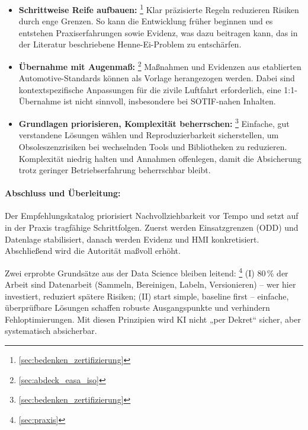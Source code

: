 \medskip
\begin{itemize}
      
  \item \textbf{Schrittweise Reife aufbauen:}  \footnote{\ref{sec:bedenken_zertifizierung} }
        Klar präzisierte Regeln reduzieren Risiken durch enge Grenzen. 
        So kann die Entwicklung früher beginnen und es entstehen Praxiserfahrungen sowie Evidenz, 
        was dazu beitragen kann, das in der Literatur beschriebene Henne-Ei-Problem zu entschärfen.

  \item \textbf{Übernahme mit Augenmaß:} \footnote{\ref{sec:abdeck_easa_iso} }
        Maßnahmen und Evidenzen aus etablierten Automotive-Standards können als Vorlage herangezogen werden. 
        Dabei sind kontextspezifische Anpassungen für die zivile Luftfahrt erforderlich, eine 1:1-Übernahme ist nicht sinnvoll, 
        insbesondere bei SOTIF-nahen Inhalten.
 
  \item \textbf{Grundlagen priorisieren, Komplexität beherrschen:} \footnote{\ref{sec:bedenken_zertifizierung} }
        Einfache, gut verstandene Lösungen wählen und Reproduzierbarkeit sicherstellen, 
        um Obsoleszenzrisiken bei wechselnden Tools und Bibliotheken zu reduzieren. 
        Komplexität niedrig halten und Annahmen offenlegen, damit die Absicherung trotz 
        geringer Betriebserfahrung beherrschbar bleibt.

\end{itemize}

\paragraph{Abschluss und Überleitung:}
Der Empfehlungskatalog priorisiert Nachvollziehbarkeit vor Tempo und setzt auf in der Praxis tragfähige Schrittfolgen. 
Zuerst werden Einsatzgrenzen (ODD) und Datenlage stabilisiert, danach werden Evidenz und HMI konkretisiert. 
Abschließend wird die Autorität maßvoll erhöht.

Zwei erprobte Grundsätze aus der Data Science bleiben leitend: \footnote{\ref{sec:praxis} }
(I) 80\,\% der Arbeit sind Datenarbeit (Sammeln, Bereinigen, Labeln, Versionieren) – wer hier investiert, reduziert spätere Risiken; (II) start
simple, baseline first – einfache, überprüfbare Lösungen schaffen robuste Ausgangspunkte und verhindern Fehloptimierungen.
Mit diesen Prinzipien wird KI nicht „per Dekret“ sicher, aber systematisch absicherbar.









